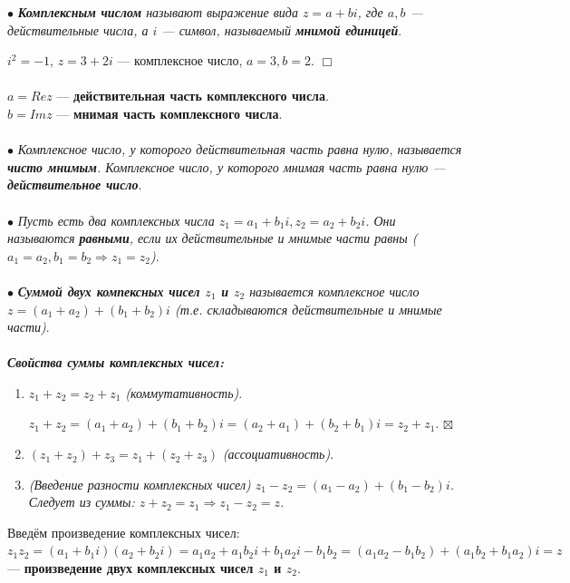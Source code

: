 \documentclass[a4paper, 12pt]{report}
\newenvironment{Proof} %
{\par\noindent{$\blacklozenge$}} %
{\hfill$\scriptstyle\boxtimes$}
\newenvironment{examp} %
{\par\noindent{\textbf{\textsc{Пример:}}}} %
{\hfill$\scriptstyle\Box$}
\begin{document}
$\bullet$ \textit{\textbf{Комплексным числом} называют выражение вида $z = a + bi$, где $a, b$ --- действительные числа, а $i$ --- символ, называемый \textbf{мнимой единицей}}.\\
\begin{examp}
	$i^2 = -1$, $z = 3 + 2i$ --- комплексное число, $a = 3, b = 2$.
\end{examp}\\\\
$a = Rez$ --- \textbf{действительная часть комплексного числа}.\\
$b = Imz$ --- \textbf{мнимая часть комплексного числа}.\\\\
$\bullet$ \textit{Комплексное число, у которого действительная часть равна нулю, называется \textbf{чисто мнимым}. Комплексное число, у которого мнимая часть равна нулю --- \textbf{действительное число}}.\\\\
$\bullet$ \textit{Пусть есть два комплексных числа $z_1 = a_1 + b_1i, z_2 = a_2 + b_2i$. Они называются \textbf{равными}, если их действительные и мнимые части равны ($a_1 = a_2, b_1 = b_2 \Rightarrow z_1 = z_2$)}.\\\\
$\bullet$ \textit{\textbf{Суммой двух компексных чисел $z_1$ и $z_2$} называется комплексное число $z = (a_1 + a_2) + (b_1 + b_2)i$ (т.е. складываются действительные и мнимые части)}.\\\\
\textbf{\textit{Свойства суммы комплексных чисел:}}
\begin{enumerate}
	\item $z_1 + z_2 = z_2 + z_1$ \textit{(коммутативность)}.
	
	\begin{Proof}
		$z_1 + z_2 = (a_1 + a_2) + (b_1 + b_2)i = (a_2 + a_1) + (b_2 + b_1)i = z_2 + z_1$. 
	\end{Proof}
	
	\item $(z_1 + z_2) + z_3 = z_1 + (z_2 + z_3)$ \textit{(ассоциативность)}.
	
	\item \textit{(Введение разности комплексных чисел) $z_1 - z_2 = (a_1 - a_2) + (b_1 - b_2)i$. Следует из суммы: $z + z_2 = z_1 \Rightarrow z_1 - z_2 = z$.}
\end{enumerate}
Введём произведение комплексных чисел: $z_1z_2 = (a_1 + b_1i)(a_2 + b_2i) = a_1a_2 + a_1b_2i + b_1a_2i - b_1b_2 = (a_1a_2 - b_1b_2) + (a_1b_2 + b_1a_2)i = z$ --- \textbf{произведение двух комплексных чисел $z_1$ и $z_2$}.\\\\
\end{document}
